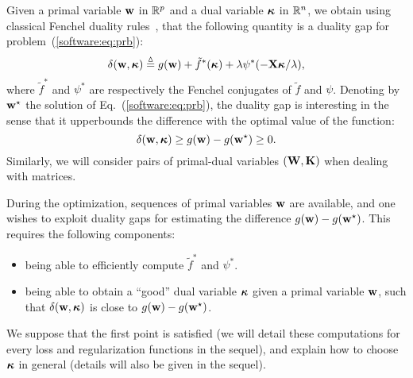 \documentclass[a4paper, 11pt]{article}
\begin{document}
             Given a primal variable ${\mathbf w}$ in ${\mathbb R}^p$ and a dual variable ${\boldsymbol\kappa}$ in
             ${\mathbb R}^n$, we obtain using classical Fenchel duality rules~\cite{borwein},
             that the following quantity is a duality gap for problem~(\ref{software:eq:prb}):
                \begin{displaymath}
                \delta({\mathbf w},{\boldsymbol\kappa}) \stackrel{\vartriangle}{=} g({\mathbf w}) + \tilde{f}^\ast({\boldsymbol\kappa}) + \lambda\psi^\ast(-{\mathbf X}{\boldsymbol\kappa} / \lambda),
                \end{displaymath}
                where $\tilde{f}^\ast$ and $\psi^\ast$ are respectively the Fenchel conjugates
                of $\tilde{f}$ and $\psi$.  Denoting by ${\mathbf w}^\star$ the solution of
                Eq.~(\ref{software:eq:prb}), the duality gap is interesting in the sense that
                it upperbounds the difference with the optimal value of the function:
                \begin{displaymath}
                \delta({\mathbf w},{\boldsymbol\kappa}) \geq  g({\mathbf w})-g({\mathbf w}^\star) \geq 0.
                \end{displaymath}
                Similarly, we will consider pairs of primal-dual variables $({\mathbf W},{\mathbf K})$ when
                dealing with matrices.

                During the optimization, sequences of primal variables ${\mathbf w}$ are available,
                and one wishes to exploit duality gaps for estimating the difference
                $g({\mathbf w})-g({\mathbf w}^\star)$. This requires the following components:
                \begin{itemize}
                \item being able to efficiently compute $\tilde{f}^\ast$ and $\psi^\ast$.
                \item being able to obtain a ``good'' dual variable ${\boldsymbol\kappa}$ given a primal
                variable ${\mathbf w}$, such that $\delta({\mathbf w},{\boldsymbol\kappa})$ is close to
                $g({\mathbf w})-g({\mathbf w}^\star)$.
                \end{itemize}

                We suppose that the first point is satisfied (we will detail these computations
                      for every loss and regularization functions in the sequel), and explain how to
                choose ${\boldsymbol\kappa}$ in general (details will also be given in the sequel).
\end{document}
